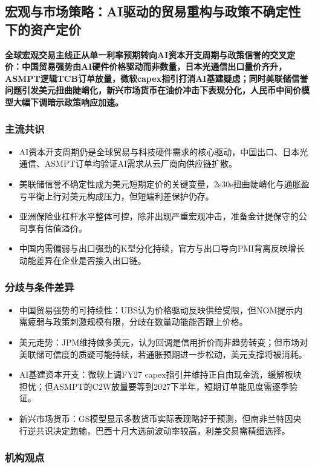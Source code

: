 \documentclass[11pt]{ctexart}
\begin{document}
\subsection{宏观与市场策略：AI驱动的贸易重构与政策不确定性下的资产定价}
\textbf{全球宏观交易主线正从单一利率预期转向AI资本开支周期与政策信誉的交叉定价：中国贸易强势由AI硬件价格驱动而非数量，日本光通信出口量价齐升，ASMPT逻辑TCB订单放量，微软capex指引打消AI基建疑虑；同时美联储信誉问题引发美元扭曲陡峭化，新兴市场货币在油价冲击下表现分化，人民币中间价模型大幅下调暗示政策响应加速。}
\subsubsection*{主流共识}
\begin{itemize}
  \item AI资本开支周期仍是全球贸易与科技硬件需求的核心驱动，中国出口、日本光通信、ASMPT订单均验证AI需求从云厂商向供应链扩散。
  \item 美联储信誉不确定性成为美元短期定价的关键变量，2s30s扭曲陡峭化与通胀盈亏平衡上行对美元构成压力，但短端利差保护仍存。
  \item 亚洲保险业杠杆水平整体可控，除非出现严重宏观冲击，准备金计提保守的公司享有估值溢价。
  \item 中国内需偏弱与出口强劲的K型分化持续，官方与出口导向PMI背离反映增长动能差异在企业是否接入出口链。
\end{itemize}
\subsubsection*{分歧与条件差异}
\begin{itemize}
  \item 中国贸易强势的可持续性：UBS认为价格驱动反映供给受限，但NOM提示内需疲弱与政策刺激规模有限，分歧在数量动能能否跟上价格。
  \item 美元走势：JPM维持做多美元，认为回调是信用折价而非趋势转变；但市场对美联储可信度的质疑可能持续，若通胀预期进一步松动，美元支撑将被消耗。
  \item AI基建资本开支：微软上调FY27 capex指引并维持正自由现金流，缓解板块担忧；但ASMPT的C2W放量要等到2027下半年，短期订单能见度需逐季验证。
  \item 新兴市场货币：GS模型显示多数货币实际表现略好于预测，但南非兰特因央行逆共识决定跑输，巴西十月大选前波动率较高，利差交易需精细选择。
\end{itemize}
\subsubsection*{机构观点}
\end{document}
